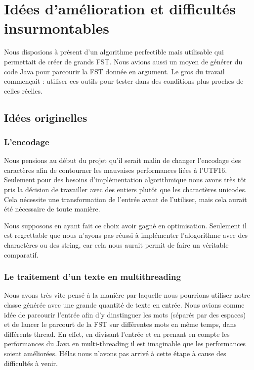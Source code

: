 \newpage
\clearpage
\section{Idées d'amélioration et difficultés insurmontables}

Nous disposions à présent d'un algorithme perfectible mais utilisable qui permettait
de créer de grands FST. Nous avions aussi un moyen de générer du code Java pour
parcourir la FST donnée en argument. Le gros du travail commençait : utiliser ces outils
pour tester dans des conditions plus proches de celles réelles.

\subsection{Idées originelles}

\subsubsection{L'encodage}

Nous pensions au début du projet qu'il serait malin de changer l'encodage des caractères afin
de contourner les mauvaises performances liées à l'UTF16. Seulement pour des besoins
d'implémentation algorithmique nous avons très tôt pris la décision de travailler avec des
entiers plutôt que les charactères unicodes. Cela nécessite une transformation de l'entrée
avant de l'utiliser, mais cela aurait été nécessaire de toute manière.


Nous supposons en ayant fait ce choix avoir gagné en optimisation. Seulement il est
regrettable que nous n'ayons pas réussi à implémenter l'alogorithme avec des charactères
ou des string, car cela nous aurait permit de faire un véritable comparatif.

\subsubsection{Le traitement d'un texte en multithreading}

Nous avons très vite pensé à la manière par laquelle nous pourrions utiliser notre classe
générée avec une grande quantité de texte en entrée.
Nous avions comme idée de parcourir l'entrée afin d'y dinstinguer les mots (séparés par des
espaces) et de lancer le parcourt de la FST sur différentes mots en même temps, dans différents thread.
En effet, en divisant l'entrée et en prenant en compte les performances du Java en
multi-threading il est imaginable que les performances soient améliorées.
Hélas nous n'avons pas arrivé à cette étape à cause des difficultés à venir.

